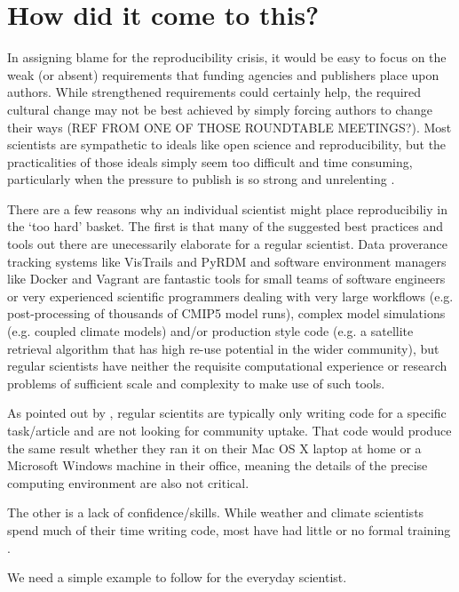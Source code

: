 \section{How did it come to this?}

In assigning blame for the reproducibility crisis, it would be easy to focus on the weak (or absent) requirements that funding agencies and publishers place upon authors. While strengthened requirements could certainly help, the required cultural change may not be best achieved by simply forcing authors to change their ways (REF FROM ONE OF THOSE ROUNDTABLE MEETINGS?). Most scientists are sympathetic to ideals like open science and reproducibility, but the practicalities of those ideals simply seem too difficult and time consuming, particularly when the pressure to publish is so strong and unrelenting \citep{Stodden2010}. 

There are a few reasons why an individual scientist might place reproducibiliy in the `too hard' basket. The first is that many of the suggested best practices and tools out there are unecessarily elaborate for a regular scientist. Data proverance tracking systems like VisTrails \citep{Freire2012} and PyRDM \citep{Jacobs2014} and software environment managers like Docker and Vagrant \citep{Stodden2014} are fantastic tools for small teams of software engineers or very experienced scientific programmers dealing with very large workflows (e.g. post-processing of thousands of CMIP5 model runs), complex model simulations (e.g. coupled climate models) and/or production style code (e.g. a satellite retrieval algorithm that has high re-use potential in the wider community), but regular scientists have neither the requisite computational experience or research problems of sufficient scale and complexity to make use of such tools.      

As pointed out by \citet{Easterbrook2014}, regular scientits are typically only writing code for a specific task/article and are not looking for community uptake. That code would produce the same result whether they ran it on their Mac OS X laptop at home or a Microsoft Windows machine in their office, meaning the details of the precise computing environment are also not critical.

The other is a lack of confidence/skills. While weather and climate scientists spend much of their time writing code, most have had little or no formal training \citet{Hannay2009}.   


We need a simple example to follow for the everyday scientist.